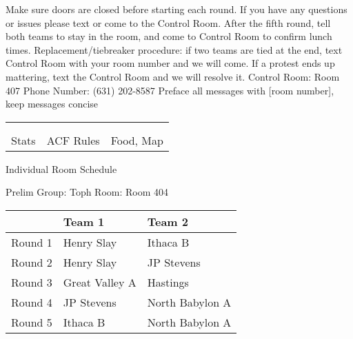 \documentclass{article}%
\begin{document}
\newline%
Make sure doors are closed before starting each round. If you have any questions or issues please text or come to the Control Room.\newline%
\newline%
After the fifth round, tell both teams to stay in the room, and come to Control Room to confirm lunch times.\newline%
\newline%
Replacement/tiebreaker procedure: if two teams are tied at the end, text Control Room with your room number and we will come. If a protest ends up mattering, text the Control Room and we will resolve it.\newline%
\newline%
Control Room: Room 407\newline%
Phone Number: (631) 202{-}8587\newline%
Preface all messages with {[}room number{]}, keep messages concise%
\vspace*{30pt}%
\newline%
%
\begin{tabularx}{\textwidth}{YYY}%
  &  &  \\%
\\%
Stats&ACF Rules&Food, Map\\%
\end{tabularx}%
\newpage%
\begin{center}%
\begin{Huge}%
Individual Room Schedule%
\end{Huge}%
\vspace*{16pt}%
\linebreak%
\begin{Large}%
Prelim Group: Toph \hfill Room: Room 404%
\end{Large}%
\end{center}%
%
\begin{tabularx}{\textwidth}{|c|Y|Y|}%
\hline%
&Team 1&Team 2\\%
\hline%
Round 1&Henry Slay&Ithaca B\\%
Round 2&Henry Slay&JP Stevens\\%
Round 3&Great Valley A&Hastings\\%
Round 4&JP Stevens&North Babylon A\\%
Round 5&Ithaca B&North Babylon A\\%
\hline%
\end{tabularx}%
\end{document}
